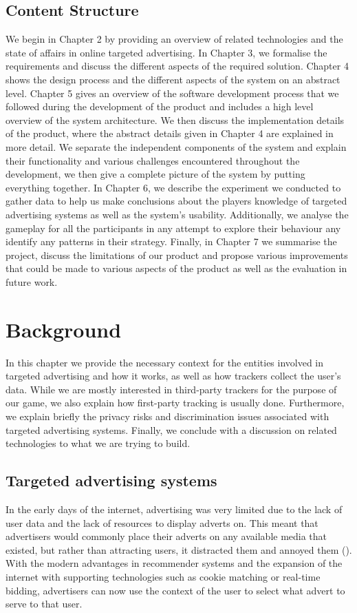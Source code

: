 \documentclass{l4proj}
\begin{document}
\section{Content Structure}
We begin in Chapter 2 by providing an overview of related technologies and the state of affairs in online targeted advertising. In Chapter 3, we formalise the requirements and discuss the different aspects of the required solution. Chapter 4 shows the design process and the different aspects of the system on an abstract level. Chapter 5 gives an overview of the software development process that we followed during the development of the product and includes a high level overview of the system architecture. We then discuss the implementation details of the product, where the abstract details given in Chapter 4 are explained in more detail. We separate the independent components of the system and explain their functionality and various challenges encountered throughout the development, we then give a complete picture of the system by putting everything together. In Chapter 6, we describe the experiment we conducted to gather data to help us make conclusions about the players knowledge of targeted advertising systems as well as the system's usability. Additionally, we analyse the gameplay for all the participants in any attempt to explore their behaviour any identify any patterns in their strategy. Finally, in Chapter 7 we summarise the project, discuss the limitations of our product and propose various improvements that could be made to various aspects of the product as well as the evaluation in future work.

\chapter{Background}
In this chapter we provide the necessary context for the entities involved in targeted advertising and how it works, as well as how trackers collect the user's data. While we are mostly interested in third-party trackers for the purpose of our game, we also explain how first-party tracking is usually done. Furthermore, we explain briefly the privacy risks and discrimination issues associated with targeted advertising systems. Finally, we conclude with a discussion on related technologies to what we are trying to build.

\section{Targeted advertising systems}
\label{targeted}
In the early days of the internet, advertising was very limited due to the lack of user data and the lack of resources to display adverts on. This meant that advertisers would commonly place their adverts on any available media that existed, but rather than attracting users, it distracted them and annoyed them (\cite{earlyads}). With the modern advantages in recommender systems and the expansion of the internet with supporting technologies such as cookie matching or real-time bidding, advertisers can now use the context of the user to select what advert to serve to that user.    
\end{document}
